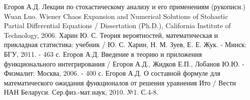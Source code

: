 \documentclass [12pt]{report}
\begin{document}
\begin{thebibliography}{99}
 Егоров А.Д. Лекции по стохастическому анализу и его применениям (рукописн.)
 Wuan Luo. Wiener Chaos Expansion and Numerical Solutions of Stohastic Partial Differential Equations / Dissertation (Ph.D.), California Institute of Technology, 2006.
 Харин Ю. С. Теория вероятностей, математическая и прикладная статистика: учебник / Ю. С. Харин, Н. М. Зуев, Е. Е. Жук. - Минск: БГУ, 2011. - 463 с.
 Егоров А.Д. Введение в теорию и приложения функционального интегрирования / Егоров А.Д., Жидков Е.П., Лобанов Ю.Ю. -
Физмалит: Москва, 2006. - 400 с.
 Егоров А.Д. О составной формуле для математического ожидания функционалов от решения уравнения Ито / Вести НАН Беларуси.
Сер.физ.-мат.наук, 2010. №1. С.4-8.
\end{thebibliography}
\end{document}
